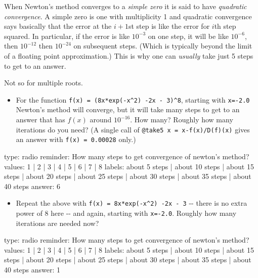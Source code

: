 \documentclass[12pt]{article}
\begin{document}
When Newton's method converges to a \emph{simple zero} it is said to
have \emph{quadratic convergence}. A simple zero is one with
multiplicity 1 and quadratic convergence says basically that the error
at the $i+1$st step is like the error for $i$th step squared. In
particular, if the error is like $10^{-3}$ on one step, it will be like
$10^{-6}$, then $10^{-12}$ then $10^{-24}$ on subsequent steps. (Which
is typically beyond the limit of a floating point approximation.) This
is why one can \emph{usually} take just 5 steps to get to an answer.

Not so for multiple roots.

\begin{itemize}
\itemsep1pt\parskip0pt
\item
  For the function \texttt{f(x) = (8x*exp(-x\^{}2) -2x - 3)\^{}8},
  starting with \texttt{x=-2.0} Newton's method will converge, but it
  will take many steps to get to an answer that has $f(x)$ around
  $10^{-16}$. How many? Roughly how many iterations do you need? (A
  single call of \texttt{@take5 x = x-f(x)/D(f)(x)} gives an answer with
  \texttt{f(x) = 0.00028} only.)
\end{itemize}

\begin{answer}
type: radio
reminder: How many steps to get convergence of newton's method?
values: 1 | 2 | 3 | 4 | 5 | 6 | 7 | 8
labels: about 5 steps | about 10 steps | about 15 steps | about 20 steps | about 25 steps | about 30 steps | about 35 steps | about 40 steps
answer: 6
\end{answer}

\begin{itemize}
\itemsep1pt\parskip0pt
\item
  Repeat the above with \texttt{f(x) = 8x*exp(-x\^{}2) -2x - 3} -{}-
  there is no extra power of $8$ here -{}- and again, starting with
  \texttt{x=-2.0}. Roughly how many iterations are needed now?
\end{itemize}

\begin{answer}
type: radio
reminder: How many steps to get convergence of newton's method?
values: 1 | 2 | 3 | 4 | 5 | 6 | 7 | 8
labels: about 5 steps | about 10 steps | about 15 steps | about 20 steps | about 25 steps | about 30 steps | about 35 steps | about 40 steps
answer: 1
\end{answer}
\end{document}
